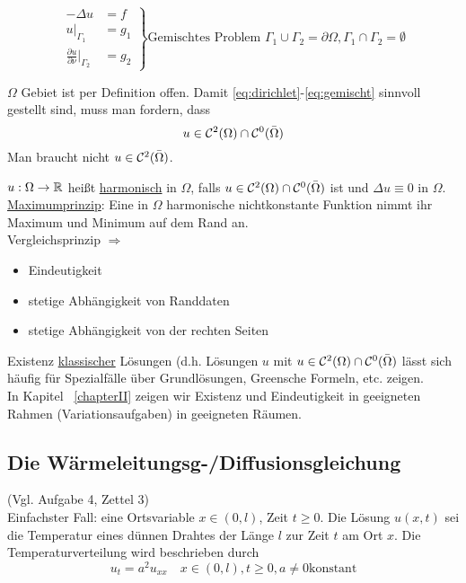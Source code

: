 \begin{equation} %
    \left.  
    \begin{aligned}
        -\Delta u & = f \\
        u\big|_{\Gamma_1} & = g_1 \\
        \frac{\partial u}{\partial \nu}\big|_{\Gamma_2} &= g_2
    \end{aligned}
\right\} \text{Gemischtes Problem }\Gamma_1 \cup \Gamma_2 = \partial\Omega, \Gamma_1 \cap \Gamma_2 = \emptyset
\label{eq:gemischt}
\end{equation}


$\Omega$ Gebiet ist per Definition offen. Damit \eqref{eq:dirichlet}-\eqref{eq:gemischt} sinnvoll gestellt sind, muss man fordern, dass 
\[
    u\in \mathcal{C}^2(\Omega)\cap\mathcal{C}^0(\bar{\Omega})
\]
Man braucht nicht $u\in \mathcal{C}^2(\bar{\Omega})$.


\begin{definition}
    $u: \Omega\to\mathbb{R}$ heißt \underline{harmonisch} in $\Omega$, falls $u\in\mathcal{C}^2(\Omega)\cap\mathcal{C}^0(\bar{\Omega})$ ist und $\Delta u \equiv 0 \text{ in } \Omega$. 
    \underline{Maximumprinzip}: Eine in $\Omega$ harmonische nichtkonstante Funktion nimmt ihr Maximum und Minimum auf dem Rand an. \\
     Vergleichsprinzip $\Rightarrow$
    \begin{itemize}
        \item Eindeutigkeit
        \item stetige Abhängigkeit von Randdaten
        \item stetige Abhängigkeit von der rechten Seiten
    \end{itemize}
\end{definition}

Existenz \underline{klassischer} Lösungen (d.h. Lösungen $u$ mit $u\in\mathcal{C}^2(\Omega)\cap\mathcal{C}^0(\bar{\Omega})$ lässt sich häufig für Spezialfälle über Grundlösungen, Greensche Formeln, etc. zeigen. \\

In Kapitel ~\ref{chapterII} zeigen wir Existenz und Eindeutigkeit in geeigneten Rahmen (Variationsaufgaben) in geeigneten Räumen.

\subsection{Die Wärmeleitungsg-/Diffusionsgleichung} %
(Vgl. Aufgabe 4, Zettel 3)\\
Einfachster Fall: eine Ortsvariable $x\in(0,l)$, Zeit $t\geq 0$. Die Lösung $u(x,t)$ sei die Temperatur eines dünnen Drahtes der Länge $l$ zur Zeit $t$ am Ort $x$. Die Temperaturverteilung wird beschrieben durch 
\setcounter{equation}{17}
\begin{equation} %
    u_t = a^2 u_{xx} \quad x\in(0,l), t\geq0, a\neq 0 \text{konstant}
    \label{}
\end{equation}

